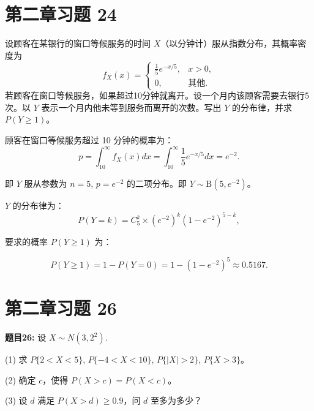 \documentclass[twoside]{article}
\begin{document}
\section{第二章习题 24}

设顾客在某银行的窗口等候服务的时间 $X$（以分钟计）服从指数分布，其概率密度为
\[
f_X(x) =
\begin{cases} 
\frac{1}{5} e^{-x/5}, & x > 0, \\
0, & \text{其他}.
\end{cases}
\]
若顾客在窗口等候服务，如果超过10分钟就离开。设一个月内该顾客需要去银行5次。以 $Y$ 表示一个月内他未等到服务而离开的次数。写出 $Y$ 的分布律，并求 $P(Y \geq 1)$。

\begin{ans}{24}{24}

顾客在窗口等候服务超过 10 分钟的概率为：
\[
p = \int_{10}^{\infty} f_X(x) dx = \int_{10}^{\infty} \frac{1}{5} e^{-x/5} dx = e^{-2}.
\]

即 $Y$ 服从参数为 $n = 5$, $p = e^{-2}$ 的二项分布。即 $Y \sim \text{B}(5, e^{-2})$。

$Y$ 的分布律为：
\[
P(Y = k) =  C_{5}^{k} \times (e^{-2})^k (1 - e^{-2})^{5-k},
\]

要求的概率 $P(Y \geq 1)$ 为：

\[
P(Y \geq 1) = 1 - P(Y = 0) = 1 - (1 - e^{-2})^5 \approx 0.5167.
\]

\end{ans}

\section{第二章习题 26}

\textbf{题目26:} 设 $X \sim N(3, 2^2)$.

(1) 求 $P\{2 < X < 5\}$, $P\{-4 < X < 10\}$, $P\{|X| > 2\}$, $P\{X > 3\}$。

(2) 确定 $c$，使得 $P(X > c) = P(X < c)$。

(3) 设 $d$ 满足 $P(X > d) \geq 0.9$，问 $d$ 至多为多少？
\end{document}
